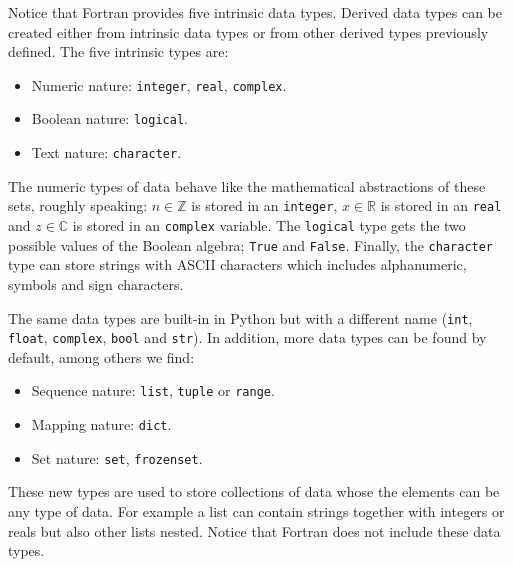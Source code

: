 Notice that Fortran provides five intrinsic data types. 
Derived data types can be created either from intrinsic data types or from other derived types previously defined.
The five intrinsic types are:
\begin{itemize}
    \item Numeric nature: \texttt{integer}, \texttt{real}, \texttt{complex}. 
    \item Boolean nature: \texttt{logical}.
    \item Text nature: \texttt{character}.
\end{itemize}
The numeric types of data behave like the mathematical abstractions of these sets, 
roughly speaking: $n\in \mathbb{Z}$ is stored in an \texttt{integer}, $x\in \mathbb{R}$ is stored in an \texttt{real} and $z\in \mathbb{C}$ is stored in an \texttt{complex} variable.
The \texttt{logical} type gets the two possible values of the Boolean algebra; \texttt{True} and \texttt{False}. 
Finally, the \texttt{character} type can store strings with ASCII characters which includes alphanumeric, symbols and sign characters.   




The same data types are built-in in Python but with a different name (\texttt{int}, \texttt{float}, \texttt{complex}, \texttt{bool} and \texttt{str}). 
In addition, more data types can be found by default, among others we find:
\begin{itemize}
    \item Sequence nature: \texttt{list}, \texttt{tuple} or \texttt{range}.
    \item Mapping nature: \texttt{dict}.
    \item Set nature: \texttt{set}, \texttt{frozenset}.
\end{itemize}
These new types are used to store collections of data whose the elements can be any type of data. 
For example a list can contain strings together with integers or reals but also other lists nested. 
Notice that Fortran does not include these data types.







